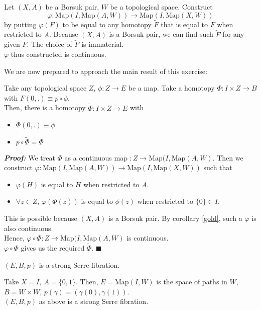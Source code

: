 \documentclass[11pt]{article}
\numberwithin{equation}{section}
\begin{document}
\begin{cor}\label{gold}
	Let $(X,A)$ be a Borsuk pair, $W$ be a topological space. Construct $$\varphi:\text{Map}(I,\text{Map}(A,W))\rightarrow\text{Map}(I,\text{Map}(X,W))$$ by putting $\varphi(F)$ to be equal to any homotopy $\tilde{F}$ that is equal to $F$ when restricted to $A$. Because $(X,A)$ is a Borsuk pair, we can find such $\tilde{F}$ for any given $F$. The choice of $\tilde{F}$ is immaterial. \\ 
	$\varphi$ thus constructed is continuous. 
\end{cor}
We are now prepared to approach the main result of this exercise:
\begin{thm}
	Take any topological space $Z$, $\phi:Z\rightarrow E$ be a map. Take a homotopy $\Phi:I\times Z\rightarrow B$ with $F(0,.)\equiv p\circ \phi$. \\ Then, there is a homotopy $\tilde{\Phi}:I\times Z\rightarrow E$ with 
	\begin{itemize}
	\item $\tilde{\Phi}(0,.)\equiv \phi$
	\item $p\circ \tilde{\Phi} = \Phi$
	\end{itemize}
\end{thm}
\textbf{\emph{Proof:}}
We treat $\Phi$ as a continuous map $:Z\rightarrow\text{Map}(I,\text{Map}(A,W)$. Then we construct $\varphi:\text{Map}(I,\text{Map}(A,W))\rightarrow\text{Map}(I,\text{Map}(X,W))$ such that 
\begin{itemize}
\item $\varphi(H)$ is equal to $H$ when restricted to $A$. 
\item $\forall z\in Z$, $\varphi(\Phi(z))$ is equal to $\phi(z)$ when restricted to $\{0\}\in I$. 
\end{itemize}
This is possible because $(X,A)$ is a Borsuk pair. By corollary \ref{gold}, such a $\varphi$ is also continuous.\\ Hence, $\varphi\circ\Phi:Z \rightarrow\text{Map}(I,\text{Map}(A,W)$ is continuous. \\ 
$\varphi\circ\Phi$ gives us the required $\tilde{\Phi}$. $\blacksquare$
\begin{cor}
$(E,B,p)$ is a strong Serre fibration.
\end{cor}
\begin{cor}
Take $X=I,\ A=\{0,1\}$. Then, $E=\text{Map}(I,W)$ is the space of paths in $W$, $B=W\times W$, $p(\gamma) = (\gamma(0), \gamma(1))$. \\$(E,B,p)$ as above is a strong Serre fibration.
\end{cor}
\end{document}
